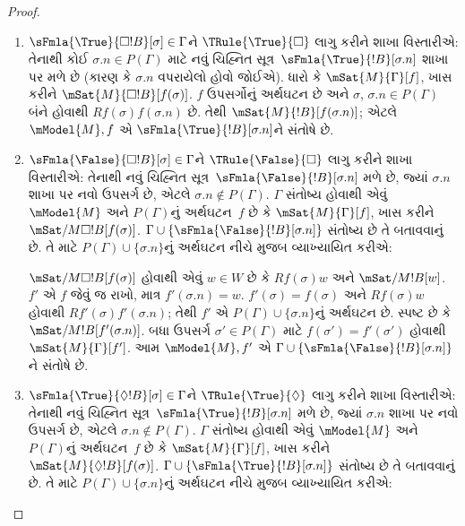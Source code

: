 \begin{proof}
\begin{enumerate}
%
\item $\sFmla{\True}{\Box !B}[\sigma] \in \Gamma$ને
  $\TRule{\True}{\Box}$ લાગુ કરીને શાખા વિસ્તારીએ:
  તેનાથી કોઈ
    $\sigma.n \in P(\Gamma)$ માટે નવું ચિહ્નિત સૂત્ર~$\sFmla{\True}{!B}[\sigma.n]$ શાખા પર મળે છે
    (કારણ કે $\sigma.n$ વપરાયેલો હોવો જોઈએ). ધારો કે
    $\mSat{M}{\Gamma}[f]$, ખાસ કરીને
    $\mSat{M}{\Box !B}[f(\sigma)]$. $f$ ઉપસર્ગોનું અર્થઘટન છે
    અને $\sigma$, $\sigma.n \in P(\Gamma)$ બંને હોવાથી
    $Rf(\sigma)f(\sigma.n)$ છે. તેથી
    $\mSat{M}{!B}[f(\sigma.n)]$; એટલે $\mModel{M}, f$ એ
    $\sFmla{\True}{!B}[\sigma.n]$ને સંતોષે છે.

\item $\sFmla{\False}{\Box !B}[\sigma] \in \Gamma$ને
  $\TRule{\False}{\Box}$ લાગુ કરીને શાખા વિસ્તારીએ:
  તેનાથી નવું ચિહ્નિત સૂત્ર~$\sFmla{\False}{!B}[\sigma.n]$ મળે છે, જ્યાં
    $\sigma.n$ શાખા પર નવો ઉપસર્ગ છે, એટલે
    $\sigma.n \notin P(\Gamma)$.
$\Gamma$ સંતોષ્ય હોવાથી એવું $\mModel{M}$ અને
    $P(\Gamma)$નું અર્થઘટન~$f$ છે કે
    $\mSat{M}{\Gamma}[f]$, ખાસ કરીને
    $\mSat/{M}{\Box !B}[f(\sigma)]$.
    $\Gamma \cup \{\sFmla{\False}{!B}[\sigma.n]\}$ સંતોષ્ય છે
    તે બતાવવાનું છે. તે માટે $P(\Gamma)
    \cup \{\sigma.n\}$નું અર્થઘટન નીચે મુજબ વ્યાખ્યાયિત કરીએ:

  $\mSat/{M}{\Box !B}[f(\sigma)]$ હોવાથી એવું $w \in W$ છે કે
  $Rf(\sigma)w$ અને $\mSat/{M}{!B}[w]$. $f'$ એ $f$ જેવું જ
  રાખો, માત્ર $f'(\sigma.n) = w$. $f'(\sigma) = f(\sigma)$
  અને $Rf(\sigma)w$ હોવાથી $Rf'(\sigma)f'(\sigma.n)$;
  તેથી $f'$ એ $P(\Gamma) \cup \{\sigma.n\}$નું અર્થઘટન છે.
  સ્પષ્ટ છે કે $\mSat/{M}{!B}[f'(\sigma.n)]$.
  બધા ઉપસર્ગ $\sigma' \in P(\Gamma)$ માટે
  $f(\sigma') = f'(\sigma')$ હોવાથી $\mSat{M}{\Gamma}[f']$.
  આમ $\mModel{M}, f'$ એ $\Gamma \cup
  \{\sFmla{\False}{!B}[\sigma.n]\}$ને સંતોષે છે.
  

%
\item $\sFmla{\True}{\Diamond !B}[\sigma] \in \Gamma$ને
  $\TRule{\True}{\Diamond}$ લાગુ કરીને શાખા વિસ્તારીએ:
  તેનાથી નવું ચિહ્નિત સૂત્ર~$\sFmla{\True}{!B}[\sigma.n]$ મળે છે, જ્યાં
    $\sigma.n$ શાખા પર નવો ઉપસર્ગ છે, એટલે
    $\sigma.n \notin P(\Gamma)$.
$\Gamma$ સંતોષ્ય હોવાથી એવું $\mModel{M}$ અને
    $P(\Gamma)$નું અર્થઘટન~$f$ છે કે
    $\mSat{M}{\Gamma}[f]$, ખાસ કરીને
    $\mSat{M}{\Diamond !B}[f(\sigma)]$.
    $\Gamma \cup \{\sFmla{\True}{!B}[\sigma.n]\}$ સંતોષ્ય છે
    તે બતાવવાનું છે. તે માટે $P(\Gamma)
    \cup \{\sigma.n\}$નું અર્થઘટન નીચે મુજબ વ્યાખ્યાયિત કરીએ:


\end{enumerate}
\end{proof}
